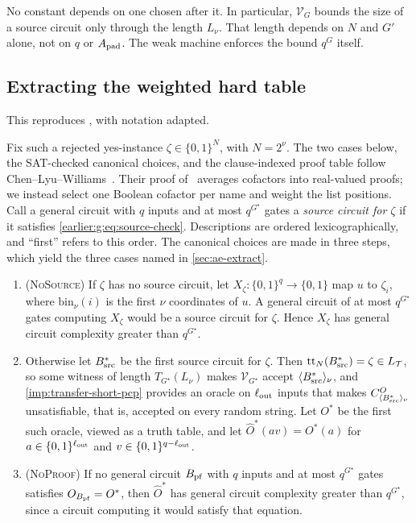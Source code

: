 No constant depends on one chosen after it. In particular,
\(\mathcal V_G\) bounds the size of a source circuit only through the
length \(L_\nu\). That length depends on \(N\) and \(G'\) alone, not on
\(q\) or \(A_{\rm pad}\). The weak machine enforces the bound \(q^G\)
itself.

\subsection{Extracting the weighted hard table}\label{earlier:gate-canonical}

This reproduces \cite[Section~11.5]{NagCG}, with notation adapted. \label{earlier:g:sec:gadget-extract}

Fix such a rejected yes-instance $\zeta\in\{0,1\}^N$, with $N=2^\nu$. The
two cases below, the
SAT-checked canonical choices, and the clause-indexed proof table
follow Chen--Lyu--Williams~\cite[Sections~6.2.4--6.2.5]{CLW20}.
Their proof of~\cite[Lemma~6.5]{CLW20} averages cofactors into
real-valued proofs; we instead select one
Boolean cofactor per name and weight the list positions. Call a general
circuit with $q$ inputs and at most $q^{G^\star}$ gates a \emph{source circuit
for $\zeta$} if it satisfies \eqref{earlier:g:eq:source-check}. Descriptions are
ordered lexicographically, and ``first'' refers to this order. The
canonical choices are made in three steps, which yield the three cases
named in \cref{sec:ae-extract}.
\begin{enumerate}[label=(\roman*)]
\item (\textsc{NoSource}) If $\zeta$ has no source circuit, let $X_\zeta:\{0,1\}^q\to\{0,1\}$ map
$u$ to $\zeta_i$, where $\mathrm{bin}_\nu(i)$ is the first $\nu$ coordinates
of $u$. A general circuit of at most $q^{G^\star}$ gates computing $X_\zeta$ would
be a source circuit for $\zeta$. Hence $X_\zeta$ has general circuit complexity
greater than $q^{G^\star}$.
\item Otherwise let $B^*_{\rm src}$ be the first source circuit for $\zeta$.
Then $\mathrm{tt}_N(B^*_{\rm src})=\zeta\in L_{\mathcal T}$, so some witness of
length $T_{{G^\star}}(L_\nu)$ makes $\mathcal V_{{G^\star}}$ accept
$\langle B^*_{\rm src}\rangle_\nu$, and \cref{imp:transfer-short-pcp} provides an
oracle on $\ell_{\rm out}$ inputs that makes
$C^O_{\langle B^*_{\rm src}\rangle_\nu}$ unsatisfiable, that is,
accepted on every random string. Let $O^*$ be the first such oracle,
viewed as a truth table, and let $\widehat O^*(av)=O^*(a)$ for
$a\in\{0,1\}^{\ell_{\rm out}}$ and $v\in\{0,1\}^{q-\ell_{\rm out}}$.
\item (\textsc{NoProof}) If no general circuit $B_{\rm pf}$ with $q$ inputs and at most
$q^{G^\star}$ gates satisfies $O_{B_{\rm pf}}=O^*$, then $\widehat O^*$ has
general circuit complexity greater than $q^{G^\star}$, since a circuit computing
it would satisfy that equation.
\end{enumerate}
